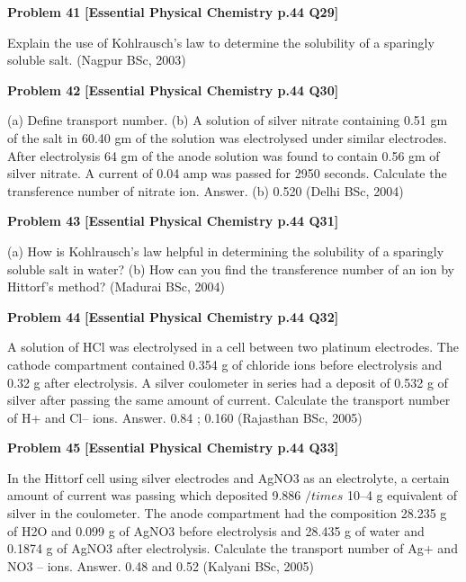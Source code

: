 \begin{problembox}
\textbf{Problem 41} \hfill \textbf{[Essential Physical Chemistry p.44 Q29]}
\label{q:ext-essential_all_questions-41}

Explain the use of Kohlrausch's law to determine the solubility of a sparingly soluble salt.
(Nagpur BSc, 2003)
\end{problembox}

\begin{problembox}
\textbf{Problem 42} \hfill \textbf{[Essential Physical Chemistry p.44 Q30]}
\label{q:ext-essential_all_questions-42}

(a)
Define transport number.
(b)
A solution of silver nitrate containing 0.51 gm of the salt in 60.40 gm of the solution was electrolysed
under similar electrodes. After electrolysis 64 gm of the anode solution was found to contain 0.56
gm of silver nitrate. A current of 0.04 amp was passed for 2950 seconds. Calculate the transference
number of nitrate ion.
Answer. (b) 0.520
(Delhi BSc, 2004)
\end{problembox}

\begin{problembox}
\textbf{Problem 43} \hfill \textbf{[Essential Physical Chemistry p.44 Q31]}
\label{q:ext-essential_all_questions-43}

(a)
How is Kohlrausch's law helpful in determining the solubility of a sparingly soluble salt in water?
(b)
How can you find the transference number of an ion by Hittorf's method?
(Madurai BSc, 2004)
\end{problembox}

\begin{problembox}
\textbf{Problem 44} \hfill \textbf{[Essential Physical Chemistry p.44 Q32]}
\label{q:ext-essential_all_questions-44}

A solution of HCl was electrolysed in a cell between two platinum electrodes. The cathode compartment
contained 0.354 g of chloride ions before electrolysis and 0.32 g after electrolysis. A silver coulometer in
series had a deposit of 0.532 g of silver after passing the same amount of current. Calculate the transport
number of H+ and Cl-- ions.
Answer. 0.84 ;  0.160
(Rajasthan BSc, 2005)
\end{problembox}

\begin{problembox}
\textbf{Problem 45} \hfill \textbf{[Essential Physical Chemistry p.44 Q33]}
\label{q:ext-essential_all_questions-45}

In the Hittorf cell using silver electrodes and AgNO3 as an electrolyte, a certain amount of current was
passing which  deposited  9.886  $/times$  10--4 g equivalent of silver in the coulometer. The anode compartment
had the composition 28.235 g of H2O and 0.099 g of AgNO3 before electrolysis and 28.435 g of water and
0.1874 g of AgNO3 after electrolysis. Calculate the transport number of Ag+ and NO3
-- ions.
Answer. 0.48 and 0.52
(Kalyani BSc, 2005)
\end{problembox}

